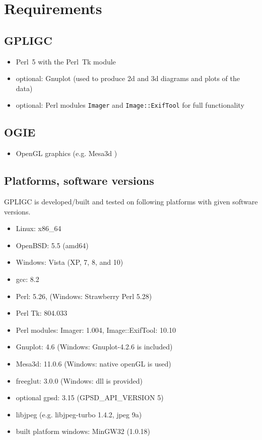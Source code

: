 \section{Requirements}
\label{requirements}

\subsection*{GPLIGC}

\begin{itemize}
\item Perl~5 with the Perl~Tk module \cite{perl,perltk}
\item {\scriptsize optional:} Gnuplot \cite{gnuplot} (used to produce 2d and 3d diagrams and plots of the data)
\item {\scriptsize optional:} Perl modules \texttt{Imager} \cite{imager} and \texttt{Image::ExifTool} \cite{exiftool} for full functionality
\end{itemize}


\subsection*{OGIE}

\begin{itemize}
\item OpenGL graphics (e.g. Mesa3d \cite{mesa})
\end{itemize}


\subsection*{Platforms, software versions}
GPLIGC is developed/built and tested on following platforms with given software versions.

\begin{itemize}
\item Linux: x86\_64
\item OpenBSD: 5.5 (amd64)
\item Windows: Vista (XP, 7, 8, and 10)
\item gcc: 8.2 %
\item Perl: 5.26, %
(Windows: Strawberry Perl 5.28)
\item Perl Tk: 804.033
\item Perl modules: Imager: 1.004, %
Image::ExifTool: 10.10
\item Gnuplot: 4.6 (Windows: Gnuplot-4.2.6 is included)
\item Mesa3d: 11.0.6 (Windows: native openGL is used)
\item freeglut: 3.0.0 (Windows: dll is provided)
\item {\scriptsize optional} gpsd: 3.15 (GPSD\_API\_VERSION 5)
\item libjpeg (e.g. libjpeg-turbo 1.4.2, jpeg 9a)
\item built platform windows: MinGW32 (1.0.18)
\end{itemize}
